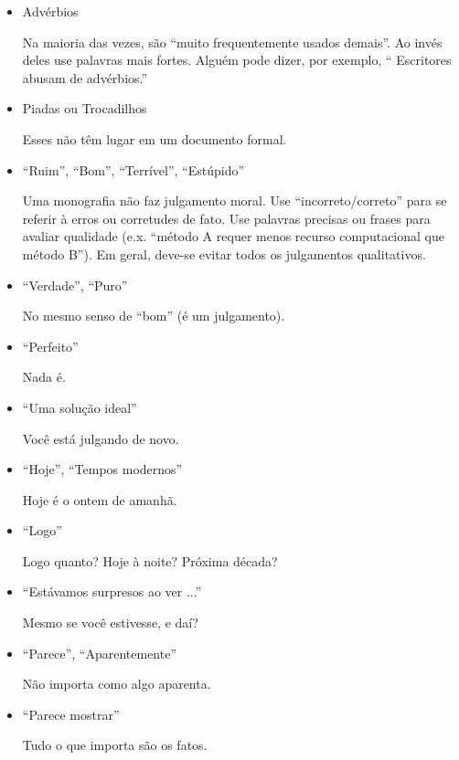\begin{itemize}

	\item Advérbios

		\indent Na maioria das vezes, são ``muito frequentemente usados demais''. Ao invés deles use palavras mais fortes. Alguém pode dizer, por exemplo, `` Escritores abusam de advérbios.''
	
	\item Piadas ou Trocadilhos

		\indent Esses não têm lugar em um documento formal.
	
	\item ``Ruim'', ``Bom'', ``Terrível'', ``Estúpido''

		\indent Uma monografia não faz julgamento moral. Use ``incorreto/correto'' para se referir à erros ou corretudes de fato.
		Use palavras precisas ou frases para avaliar qualidade (e.x. ``método A requer menos recurso computacional que método B''). Em geral, deve-se evitar todos os julgamentos qualitativos.
		
	\item ``Verdade'', ``Puro''

		\indent No mesmo senso de ``bom'' (é um julgamento).
		
	\item ``Perfeito''

		\indent Nada é.
		
	\item ``Uma solução ideal''

		\indent Você está julgando de novo.
		
	\item ``Hoje'', ``Tempos modernos''

		\indent Hoje é o ontem de amanhã.
		
	\item ``Logo''

		\indent Logo quanto? Hoje à noite? Próxima década?
		
	\item ``Estávamos surpresos ao ver ...''

		\indent Mesmo se você estivesse, e daí?
		
	\item ``Parece'', ``Aparentemente''

		\indent Não importa como algo aparenta.
	
	\item ``Parece mostrar''

		\indent Tudo o que importa são os fatos.
		

\end{itemize}
